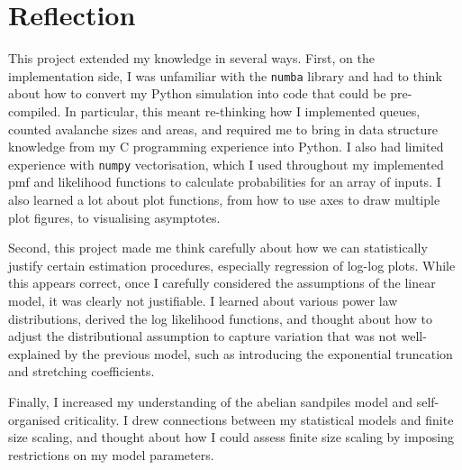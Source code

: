 \section{Reflection}
This project extended my knowledge in several ways. First, on the implementation side, I was unfamiliar with the \texttt{numba} library and had to think about how to convert my Python simulation into code that could be pre-compiled. In particular, this meant re-thinking how I implemented queues, counted avalanche sizes and areas, and required me to bring in data structure knowledge from my C programming experience into Python. I also had limited experience with \texttt{numpy} vectorisation, which I used throughout my implemented pmf and likelihood functions to calculate probabilities for an array of inputs. I also learned a lot about plot functions, from how to use axes to draw multiple plot figures, to visualising asymptotes.

Second, this project made me think carefully about how we can statistically justify certain estimation procedures, especially regression of log-log plots. While this appears correct, once I carefully considered the assumptions of the linear model, it was clearly not justifiable. I learned about various power law distributions, derived the log likelihood functions, and thought about how to adjust the distributional assumption to capture variation that was not well-explained by the previous model, such as introducing the exponential truncation and stretching coefficients.

Finally, I increased my understanding of the abelian sandpiles model and self-organised criticality. I drew connections between my statistical models and finite size scaling, and thought about how I could assess finite size scaling by imposing restrictions on my model parameters. 
